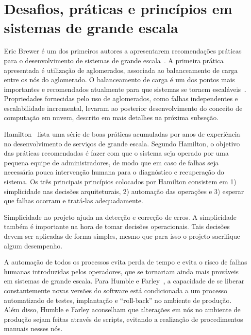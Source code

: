 \section{Desafios, práticas e princípios em sistemas de grande escala}

Eric Brewer é um dos primeiros autores a apresentarem recomendações práticas para o desenvolvimento de sistemas de grande escala~\cite{Brewer2001GiantScale}. A primeira prática apresentada é utilização de aglomerados, associada ao balanceamento de carga entre os nós do aglomerado. O balanceamento de carga é um dos pontos mais importantes e recomendados atualmente para que sistemas se tornem escaláveis~\cite{Amazon2012Practices}. Propriedades fornecidas pelo uso de aglomerados, como falhas independentes e escalabilidade incremental, levaram ao posterior desenvolvimento do conceito de computação em nuvem, descrito em mais detalhes na próxima subseção. 

Hamilton~\cite{Hamilton2007InternetScale} lista uma série de boas práticas acumuladas por anos de experiência no desenvolvimento de serviços de grande escala. Segundo Hamilton, o objetivo das práticas recomendadas é fazer com que o sistema seja operado por uma pequena equipe de administradores, de modo que em caso de falhas seja necessária pouca intervenção humana para o diagnóstico e recuperação do sistema. Os três principais princípios colocados por Hamilton consistem em 1) simplicidade nas decisões arquiteturais, 2) automação das operações e 3) esperar que falhas ocorram e tratá-las adequadamente.

Simplicidade no projeto ajuda na detecção e correção de erros. A simplicidade também é importante na hora de tomar decisões operacionais. Tais decisões devem ser aplicadas de forma simples, mesmo que para isso o projeto sacrifique algum desempenho.

A automação de todos os processos evita perda de tempo e evita o risco de falhas humanas introduzidas pelos operadores, que se tornariam ainda mais prováveis em sistemas de grande escala. Para Humble e Farley~\cite{Humble2011Continuous}, a capacidade de se liberar constantemente novas versões do software está condicionada a um processo automatizado de testes, implantação e ``roll-back'' no ambiente de produção. Além disso, Humble e Farley aconselham que alterações em nós no ambiente de produção sejam feitas através de scripts, evitando a realização de procedimentos manuais nesses nós.

